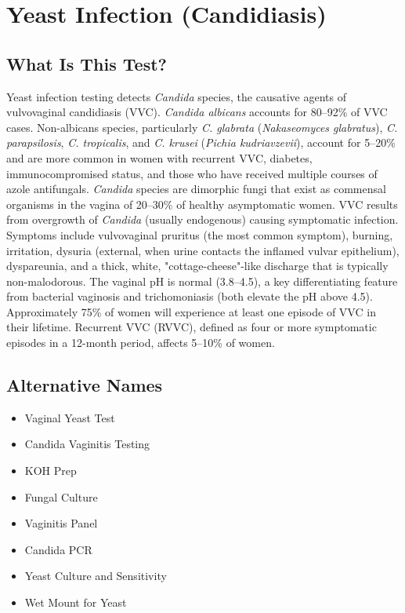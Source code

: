 \chapter{Yeast Infection (Candidiasis)}

\section*{What Is This Test?}
Yeast infection testing detects \textit{Candida} species, the causative agents of vulvovaginal candidiasis (VVC). \textit{Candida albicans} accounts for 80--92\% of VVC cases. Non-albicans species, particularly \textit{C. glabrata} (\textit{Nakaseomyces glabratus}), \textit{C. parapsilosis}, \textit{C. tropicalis}, and \textit{C. krusei} (\textit{Pichia kudriavzevii}), account for 5--20\% and are more common in women with recurrent VVC, diabetes, immunocompromised status, and those who have received multiple courses of azole antifungals. \textit{Candida} species are dimorphic fungi that exist as commensal organisms in the vagina of 20--30\% of healthy asymptomatic women. VVC results from overgrowth of \textit{Candida} (usually endogenous) causing symptomatic infection. Symptoms include vulvovaginal pruritus (the most common symptom), burning, irritation, dysuria (external, when urine contacts the inflamed vulvar epithelium), dyspareunia, and a thick, white, "cottage-cheese"-like discharge that is typically non-malodorous. The vaginal pH is normal (3.8--4.5), a key differentiating feature from bacterial vaginosis and trichomoniasis (both elevate the pH above 4.5). Approximately 75\% of women will experience at least one episode of VVC in their lifetime. Recurrent VVC (RVVC), defined as four or more symptomatic episodes in a 12-month period, affects 5--10\% of women.

\section*{Alternative Names}
\begin{itemize}
  \item Vaginal Yeast Test
  \item Candida Vaginitis Testing
  \item KOH Prep
  \item Fungal Culture
  \item Vaginitis Panel
  \item Candida PCR
  \item Yeast Culture and Sensitivity
  \item Wet Mount for Yeast
\end{itemize}
